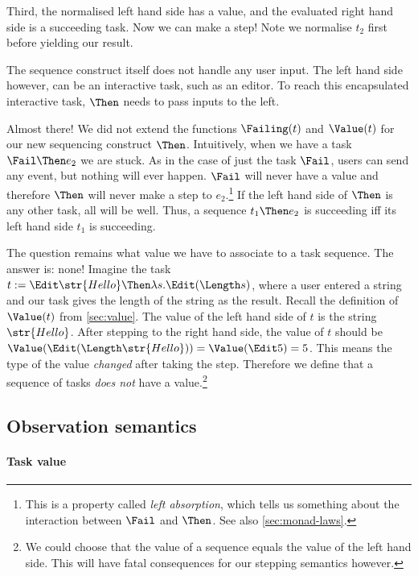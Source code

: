 Third,
the normalised left hand side has a value,
and the evaluated right hand side is a succeeding task.
Now we can make a step!
Note we normalise $t_2$ first before yielding our result.

The sequence construct itself does not handle any user input.
The left hand side however,
can be an interactive task, such as an editor.
To reach this encapsulated interactive task,
$\Then$ needs to pass inputs to the left.

Almost there!
We did not extend the functions $\Failing(t)$ and $\Value(t)$ for our new sequencing construct $\Then$.
Intuitively,
when we have a task $\Fail \Then e_2$ we are stuck.
As in the case of just the task $\Fail$,
users can send any event,
but nothing will ever happen.
$\Fail$ will never have a value
and therefore $\Then$ will never make a step to $e_2$.\footnote{
  This is a property called \emph{left absorption},
  which tells us something about the interaction between $\Fail$ and $\Then$.
  See also \autoref{sec:monad-laws}.
}
If the left hand side of $\Then$ is any other task,
all will be well.
Thus,
a sequence $t_1 \Then e_2$ is succeeding iff its left hand side $t_1$ is succeeding.

The question remains what value we have to associate to a task sequence.
The answer is: none!
Imagine the task $t := \Edit \str{Hello} \Then \lambda s.\allowbreak\Edit (\Length s)$,
where a user entered a string and our task gives the length of the string as the result.
Recall the definition of $\Value(t)$ from \autoref{sec:value}.
The value of the left hand side of $t$ is the string $\str{Hello}$.
After stepping to the right hand side,
the value of $t$ should be $\Value(\Edit (\Length\str{Hello})) = \Value(\Edit 5) = 5$.
This means the type of the value \emph{changed} after taking the step.
Therefore we define that a sequence of tasks \emph{does not} have a value.\footnote{
  We could choose that the value of a sequence equals the value of the left hand side.
  This will have fatal consequences for our stepping semantics however.
}


\subsection{Observation semantics}


\paragraph{Task value}


